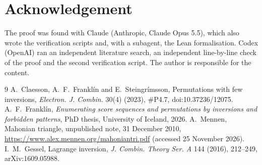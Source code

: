 \documentclass[11pt]{amsart}
\theoremstyle{remark}\newtheorem*{remark}{Remark}
\begin{document}
\section*{Acknowledgement}
The proof was found with Claude (Anthropic, Claude Opus 5.5), which also wrote the verification scripts and, with a
subagent, the Lean formalisation. Codex (OpenAI) ran an independent literature search, an independent line-by-line
check of the proof and the second verification script. The author is responsible for the content.

\begin{thebibliography}{9}
 A.~Claesson, A.~F.~Frankl\'in and E.~Steingr\'imsson, Permutations with few inversions,
\emph{Electron. J. Combin.} 30(4) (2023), \#P4.7, doi:10.37236/12075.
 A.~F.~Frankl\'in, \emph{Enumerating score sequences and permutations by inversions and forbidden patterns},
PhD thesis, University of Iceland, 2026.
 A.~Mennen, Mahonian triangle, unpublished note, 31 December 2010,
\url{https://www.alex.mennen.org/mahoniantri.pdf} (accessed 25 November 2026).
 I.~M.~Gessel, Lagrange inversion, \emph{J. Combin. Theory Ser. A} 144 (2016), 212--249, arXiv:1609.05988.
\end{thebibliography}
\end{document}
